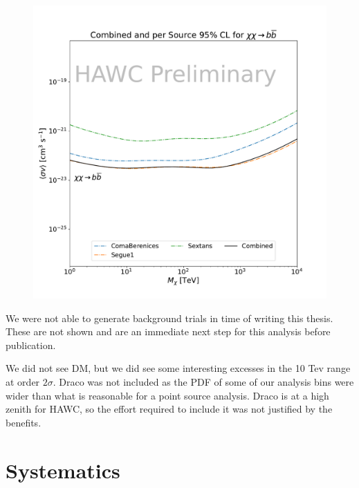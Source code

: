 \begin{figure}[h]
{    \includegraphics[scale=0.21]{figures/mtd_hawc_dm/results/Combined95_New_duck_bb_.pdf}
    }
    \caption{}
\label{fig:mtd_limits_2of2}
\end{figure}




We were not able to generate background trials in time of writing this thesis.
These are not shown and are an immediate next step for this analysis before publication.

We did not see DM, but we did see some interesting excesses in the 10 Tev range at order $2\sigma$.
Draco was not included as the PDF of some of our analysis bins were wider than what is reasonable for a point source analysis.
Draco is at a high zenith for HAWC, so the effort required to include it was not justified by the benefits.


\section{Systematics}\label{sec:mtd_systemaics}

